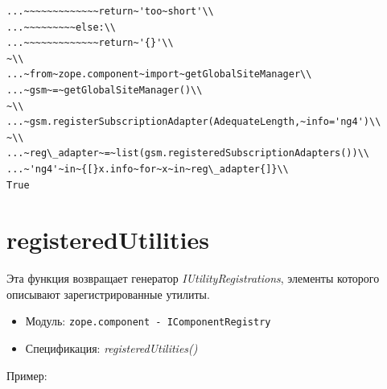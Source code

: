 \documentclass[a4paper,openany,twoside,draft]{book}
\providecommand*{\DUroletitlereference}[1]{\textsl{#1}}
\begin{document}
\begin{verbatim}
...~~~~~~~~~~~~~return~'too~short'\\
...~~~~~~~~~else:\\
...~~~~~~~~~~~~~return~'{}'\\
~\\
...~from~zope.component~import~getGlobalSiteManager\\
...~gsm~=~getGlobalSiteManager()\\
~\\
...~gsm.registerSubscriptionAdapter(AdequateLength,~info='ng4')\\
~\\
...~reg\_adapter~=~list(gsm.registeredSubscriptionAdapters())\\
...~'ng4'~in~{[}x.info~for~x~in~reg\_adapter{]}\\
True
\end{verbatim}


\section*{registeredUtilities%
  \label{registeredutilities}%
}

Эта функция возвращает генератор \DUroletitlereference{IUtilityRegistrations}, элементы
которого описывают зарегистрированные утилиты.

\begin{itemize}

\item Модуль: \texttt{zope.component - IComponentRegistry}

\item Спецификация: \DUroletitlereference{registeredUtilities()}

\end{itemize}

Пример:
\end{document}
